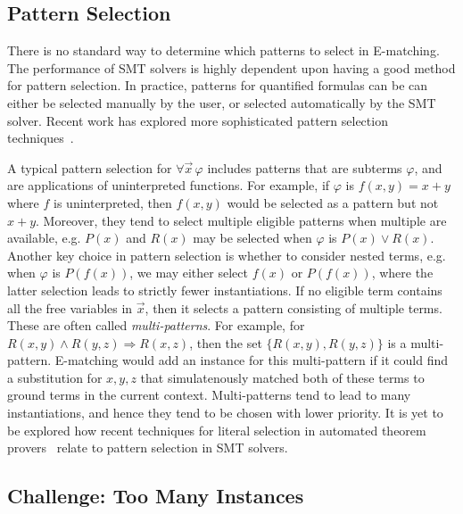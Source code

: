 \documentclass[oribibl]{llncs}
\begin{document}
\subsection{Pattern Selection}
There is no standard way to determine which patterns to select in E-matching.
The performance of SMT solvers is highly dependent upon having a good method for pattern selection.
In practice, patterns for quantified formulas can be can either be selected manually by the user,
or selected automatically by the SMT solver.
Recent work has explored more sophisticated pattern selection techniques~\cite{DBLP:conf/cav/LeinoP16}.

A typical pattern selection for $\forall \vec x\, \varphi$ includes patterns that are subterms $\varphi$,
and are applications of uninterpreted functions.
For example, if $\varphi$ is $f( x, y ) = x + y$ where $f$ is uninterpreted, then $f( x, y )$ would be selected as a pattern
but not $x + y$.
Moreover, they tend to select multiple eligible patterns when multiple are available, 
e.g. $P( x )$ and $R( x )$ may be selected when $\varphi$ is $P( x ) \vee R( x )$.
Another key choice in pattern selection is whether to consider nested terms, e.g. when $\varphi$ is $P( f( x ) )$,
we may either select $f( x )$ or $P( f( x ) )$, where the latter selection leads to strictly fewer instantiations.
If no eligible term contains all the free variables in $\vec x$, then it selects a pattern consisting of multiple terms.
These are often called \emph{multi-patterns}.
For example, for $R( x, y ) \wedge R( y, z ) \Rightarrow R( x, z )$, then the set $\{ R( x, y ), R( y, z ) \}$ is a multi-pattern.
E-matching would add an instance for this multi-pattern if it could find a substitution for $x, y, z$
that simulatenously matched both of these terms to ground terms in the current context.
Multi-patterns tend to lead to many instantiations, and hence they tend to be chosen with lower priority.
It is yet to be explored how recent techniques for literal selection in automated theorem provers~\cite{DBLP:conf/cade/HoderR0V16}
relate to pattern selection in SMT solvers.

\subsection{Challenge: Too Many Instances}
\end{document}
